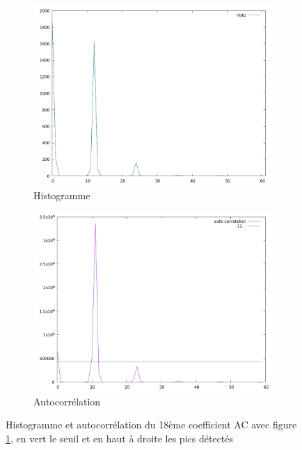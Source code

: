 \documentclass[utf8,final]{stageM2R} %
\begin{document}
\begin{figure}
  \begin{subfigure}{.5\textwidth}
    \centering
    \includegraphics[width=\linewidth]{images/histos/histo18}
    \caption{Histogramme}
  \end{subfigure}
  \begin{subfigure}{.5\textwidth}
    \centering
    \includegraphics[width=\linewidth]{images/histos/autocorrelation18}
    \caption{Autocorrélation}
    \label{fig:histo18_auto}
  \end{subfigure}
  \caption{Histogramme et autocorrélation du 18ème coefficient AC avec figure \ref{fig:histo18_auto}, en vert le seuil et en haut à droite les pics détectés}
  \label{fig:histo18}
\end{figure}
\end{document}
